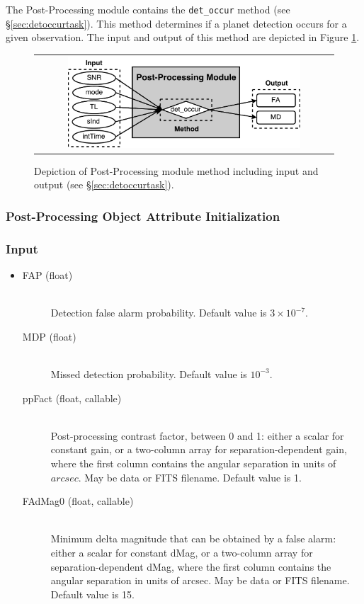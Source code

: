 \documentclass[cleanfoot]{asme2ej}
\newcommand{\reffig}[1]{Figure \ref{#1}}
\begin{document}
The Post-Processing module contains the \verb+det_occur+ method (see \S\ref{sec:detoccurtask}).  This method determines if a planet detection occurs for a given observation.  The input and output of this method are depicted in \reffig{fig:postprocessingmodule}.

\begin{figure}[ht]
    \begin{center}
        \begin{tabular}{c}
            \includegraphics[width=0.8\textwidth]{PostProcessing2}
        \end{tabular}
    \end{center}
    \caption{\label{fig:postprocessingmodule} Depiction of Post-Processing module method including input and output (see \S\ref{sec:detoccurtask}).}
\end{figure}

\subsubsection{Post-Processing Object Attribute Initialization}

\subsubsection*{Input}
\begin{itemize}
\item 
\begin{description}
    \item[FAP (float)] \hfill \\ Detection false alarm probability. Default value is $3 \times 10^{-7}$.
    \item[MDP (float)] \hfill \\ Missed detection probability. Default value is $10^{-3}$.
    \item[ppFact (float, callable)] \hfill \\ Post-processing contrast factor, between 0 and 1: either a scalar for constant gain, or a two-column array for separation-dependent gain, where the first column contains the angular separation in units of $arcsec$. May be data or FITS filename. Default value is 1.
    \item[FAdMag0 (float, callable)] \hfill \\ Minimum delta magnitude that can be obtained by a false alarm: either a scalar for constant dMag, or a two-column array for separation-dependent dMag, where the first column contains the angular separation in units of arcsec. May be data or FITS filename. Default value is 15.
\end{description}
\end{itemize}
\end{document}
